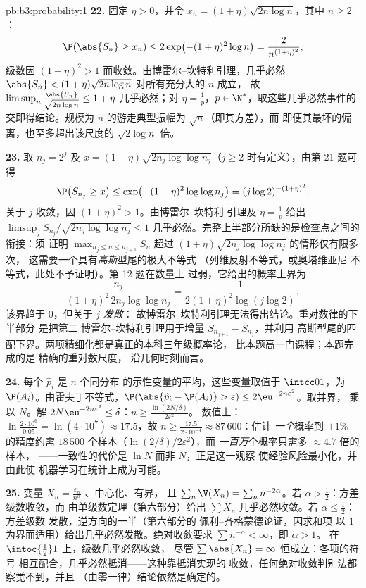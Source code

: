 \begin{solution}{pb:b3:probability:1}
\textbf{22.} 固定 $\eta > 0$，并令 $x_n = (1 +
\eta)\sqrt{2n\log n}$，其中 $n \geq 2$：
\[
\P(\abs{S_n} \geq x_n) \leq 2\exp\bigl(-(1 +
\eta)^2\log n\bigr) = \frac{2}{n^{(1+\eta)^2}},
\]
级数因 $(1 + \eta)^2 > 1$ 而收敛。由博雷尔–坎特利引理，几乎必然
$\abs{S_n} < (1 + \eta)\sqrt{2n\log n}$ 对所有充分大的 $n$ 成立，
故 $\limsup_n\frac{\abs{S_n}}{\sqrt{2n\log n}} \leq 1 +
\eta$ 几乎必然；对 $\eta =
\frac1p$，$p \in \N^*$，取这些几乎必然事件的交即得结论。规模为
$n$ 的游走典型振幅为 $\sqrt n$（即其方差），而
即便其最坏的偏离，也至多超出该尺度的
$\sqrt{2\log n}$ 倍。

\textbf{23.} 取 $n_j = 2^j$ 及 $x = (1 +
\eta)\sqrt{2n_j\log\log n_j}$（$j \geq 2$ 时有定义），由第
21 题可得
\[
\P\bigl(S_{n_j} \geq x\bigr) \leq \exp\bigl(-(1 +
\eta)^2\log\log n_j\bigr) = (j\log 2)^{-(1+\eta)^2},
\]
关于 $j$ 收敛，因 $(1 + \eta)^2 > 1$。由博雷尔–坎特利
引理及 $\eta = \frac1p$ 给出 $\limsup_jS_{n_j}/\sqrt{2n_j
\log\log n_j} \leq 1$ 几乎必然。完整上半部分所缺的是检查点之间的
衔接：须
证明 $\max_{n_j\leq n\leq n_{j+1}}S_n$ 超过
$(1+\eta)\sqrt{2n_j\log\log n_j}$ 的情形仅有限多次，
这需要一个具有\emph{高斯}型尾的极大不等式
（列维反射不等式，或奥塔维亚尼
不等式，此处不予证明）。第 12 题在数量上
过弱，它给出的概率上界为
\[
\frac{n_j}{(1+\eta)^2\,2n_j\log\log n_j}
= \frac{1}{2(1+\eta)^2\log(j\log2)},
\]
该界趋于 $0$，但关于 $j$ \emph{发散}：
故博雷尔–坎特利引理无法得出结论。重对数律的下半部分
是把第二
博雷尔–坎特利引理用于增量
$S_{n_{j+1}} - S_{n_j}$，并利用
高斯型尾的匹配下界。两项精细化都是真正的本科三年级概率论，
比本题高一门课程；本题完成的是
精确的重对数尺度，
沿几何时刻而言。

\textbf{24.} 每个 $\hat p_i$ 是 $n$ 个同分布
的示性变量的平均，这些变量取值于 $\intcc01$，为
$\P(A_i)$。由霍夫丁不等式，$\P(\abs{\hat p_i - \P(A_i)} >
\varepsilon) \leq 2\eu^{-2n\varepsilon^2}$。取并界，
乘以 $N$。解 $2N\eu^{-2n\varepsilon^2} \leq
\delta$：$n \geq \frac{\ln(2N/\delta)}{2\varepsilon^2}$。
数值上：$\ln\frac{2\cdot10^6}{0.05} =
\ln(4\cdot10^7) \approx 17.5$，故 $n \geq
\frac{17.5}{2\cdot10^{-4}} \approx 87\,600$：估计
\emph{一个}概率到 $\pm1\%$ 的精度约需 $18\,500$
个样本（$\ln(2/\delta)/2\varepsilon^2$），而
\emph{一百万}个概率只需多 $\approx 4.7$ 倍的样本，
——一致性的代价是 $\ln N$ 而非 $N$，正是这一观察
使经验风险最小化，并由此使
机器学习在统计上成为可能。

\textbf{25.} 变量 $X_n = \frac{\varepsilon_n}
{n^\alpha}$ 、中心化、有界，
且 $\sum_n\V(X_n) = \sum_nn^{-2\alpha}$。若 $\alpha >
\frac12$：方差级数收敛，而
由单级数定理（第六部分）给出
$\sum X_n$ 几乎必然收敛。若 $\alpha \leq \frac12$：方差级数
发散，逆方向的一半（第六部分的
佩利–齐格蒙德论证，因求和项
以 $1$ 为界而适用）给出几乎必然发散。绝对收敛要求
$\sum n^{-\alpha} < \infty$，即 $\alpha > 1$。
在 $\intoc{\frac12}1$ 上，级数几乎必然收敛，
尽管 $\sum\abs{X_n} = \infty$ 恒成立：各项的符号
相互配合，几乎必然抵消——这种靠抵消实现的
收敛，任何绝对收敛判别法都察觉不到，并且
（由零一律）结论依然是确定的。
\end{solution}
